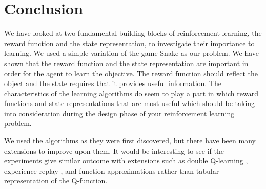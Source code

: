 \documentclass[result.tex]{subfiles}
\begin{document}
\section*{\centering Conclusion}

    We have looked at two fundamental building blocks of reinforcement learning, the reward function and the state representation, to investigate their importance to learning. We used a simple variation of the game Snake as our problem. We have shown that the reward function and the state representation are important in order for the agent to learn the objective. The reward function should reflect the object and the state requires that it provides useful information. The characteristics of the learning algorithms do seem to play a part in which reward functions and state representations that are most useful which should be taking into consideration during the design phase of your reinforcement learning problem.

    We used the algorithms as they were first discovered, but there have been many extensions to improve upon them. It would be interesting to see if the experiments give similar outcome with extensions such as double Q-learning \cite{hasselt2010double}, experience replay \cite{lin1992self}, and function approximations rather than tabular representation of the Q-function.
\end{document}
